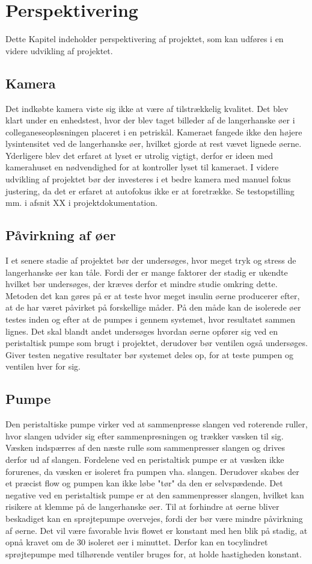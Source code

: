 \chapter{Perspektivering}
Dette Kapitel indeholder perspektivering af projektet, som kan udføres i en videre udvikling af projektet.
\section{Kamera}
Det indkøbte kamera viste sig ikke at være af tilstrækkelig kvalitet. Det blev klart under en enhedstest, hvor der blev taget billeder af de langerhanske øer i colleganeseopløsningen placeret i en petriskål. Kameraet fangede ikke den højere lysintensitet ved de langerhanske øer, hvilket gjorde at rest vævet lignede øerne. Yderligere blev det erfaret at lyset er utrolig vigtigt, derfor er ideen med kamerahuset en nødvendighed for at kontroller lyset til kameraet. I videre udvikling af projektet bør der investeres i et bedre kamera med manuel fokus justering, da det er erfaret at autofokus ikke er at foretrække. Se testopstilling mm. i afsnit XX i projektdokumentation. 

\section{Påvirkning af øer}
I et senere stadie af projektet bør der undersøges, hvor meget tryk og stress de langerhanske øer kan tåle. Fordi der er mange faktorer der stadig er ukendte hvilket bør undersøges, der kræves derfor et mindre studie omkring dette. Metoden det kan gøres på er at teste hvor meget insulin øerne producerer efter, at de har været påvirket på forskellige måder. På den måde kan de isolerede øer testes inden og efter at de pumpes i gennem systemet, hvor resultatet sammen lignes. Det skal blandt andet undersøges hvordan øerne opfører sig ved en peristaltisk pumpe som brugt i projektet, derudover bør ventilen også undersøges. Giver testen negative resultater bør systemet deles op, for at teste pumpen og ventilen hver for sig.

\section{Pumpe}
Den peristaltiske pumpe virker ved at sammenpresse slangen ved roterende ruller, hvor slangen udvider sig efter sammenpresningen og trækker væsken til sig. Væsken indspærres af den næste rulle som sammenpresser slangen og drives derfor ud af slangen. Fordelene ved en peristaltisk pumpe er at væsken ikke forurenes, da væsken er isoleret fra pumpen vha. slangen. Derudover skabes der et præcist flow og pumpen kan ikke løbe "tør" da den er selvspædende. Det negative ved en peristaltisk pumpe er at den sammenpresser slangen, hvilket kan risikere at klemme på de langerhanske øer. Til at forhindre at øerne bliver beskadiget kan en sprøjtepumpe overvejes, fordi der bør være mindre påvirkning af øerne. Det vil være favorable hvis flowet er konstant med hen blik på stadig, at opnå kravet om de 30 isoleret øer i minuttet. Derfor kan en tocylindret sprøjtepumpe med tilhørende ventiler bruges for, at holde hastigheden konstant. 

